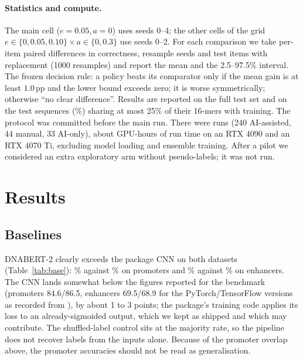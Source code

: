 \documentclass[11pt]{article}
\newcommand{\pp}{\,pp}
\begin{document}
\paragraph{Statistics and compute.} The main cell ($e=0.05,a=0$) uses seeds 0--4; the other cells of the grid $e\in\{0,0.05,0.10\}\times a\in\{0,0.3\}$ use seeds 0--2. For each comparison we take per-item paired differences in correctness, resample seeds and test items with replacement (1000 resamples) and report the mean and the 2.5--97.5\% interval. The frozen decision rule: a policy beats its comparator only if the mean gain is at least $1.0$\pp{} and the lower bound exceeds zero; it is worse symmetrically; otherwise ``no clear difference''. Results are reported on the full test set and on the \nLowOverlap{} test sequences (\pctLowOverlap\%) sharing at most 25\% of their 16-mers with training. The protocol was committed before the main run. There were \nRecords{} runs (240 AI-assisted, 44 manual, 33 AI-only), about \RunHours{} GPU-hours of run time on an RTX 4090 and an RTX 4070 Ti, excluding model loading and ensemble training. After a pilot we considered an extra exploratory arm without pseudo-labels; it was not run.

\section{Results}
\subsection{Baselines}
\begin{table}[t]
\centering\small

\caption{Full-label baselines on the official test sets (a random 10\% of the training data held out for monitoring). Majority is the accuracy of always predicting the training majority class. A control with shuffled training labels scored 54.4\% on promoters, equal to the majority rate.}\label{tab:base}
\end{table}
DNABERT-2 clearly exceeds the package CNN on both datasets (Table~\ref{tab:base}): \DnaProm\% against \CnnProm\% on promoters and \DnaEnh\% against \CnnEnh\% on enhancers. The CNN lands somewhat below the figures reported for the benchmark (promoters 84.6/86.5, enhancers 69.5/68.9 for the PyTorch/TensorFlow versions as recorded from \citet{gresova2023}), by about 1 to 3 points; the package's training code applies its loss to an already-sigmoided output, which we kept as shipped and which may contribute. The shuffled-label control sits at the majority rate, so the pipeline does not recover labels from the inputs alone. Because of the promoter overlap above, the promoter accuracies should not be read as generalisation.
\end{document}
